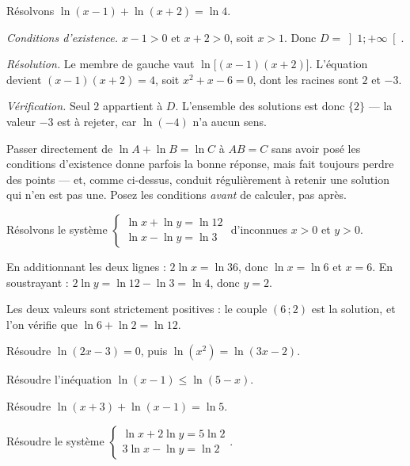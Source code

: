\begin{exemple}
Résolvons $\ln(x-1) + \ln(x+2) = \ln 4$.

\emph{Conditions d'existence.} $x-1>0$ et $x+2>0$, soit $x>1$. Donc
$D = \left]1;+\infty\right[$.

\emph{Résolution.} Le membre de gauche vaut $\ln\bigl[(x-1)(x+2)\bigr]$.
L'équation devient $(x-1)(x+2) = 4$, soit $x^{2}+x-6 = 0$, dont les racines
sont $2$ et $-3$.

\emph{Vérification.} Seul $2$ appartient à $D$. L'ensemble des solutions est
donc $\{2\}$ — la valeur $-3$ est à rejeter, car $\ln(-4)$ n'a aucun sens.
\end{exemple}

\begin{erreurclassique}
Passer directement de $\ln A + \ln B = \ln C$ à $AB = C$ sans avoir posé les
conditions d'existence donne parfois la bonne réponse, mais fait toujours
perdre des points — et, comme ci-dessus, conduit régulièrement à retenir une
solution qui n'en est pas une. Posez les conditions \emph{avant} de calculer,
pas après.
\end{erreurclassique}

\begin{exemple}
Résolvons le système
$\begin{cases} \ln x + \ln y = \ln 12 \\ \ln x - \ln y = \ln 3 \end{cases}$
d'inconnues $x>0$ et $y>0$.

En additionnant les deux lignes : $2\ln x = \ln 36$, donc $\ln x = \ln 6$ et
$x = 6$. En soustrayant : $2\ln y = \ln 12 - \ln 3 = \ln 4$, donc $y = 2$.

Les deux valeurs sont strictement positives : le couple $(6\,;2)$ est la
solution, et l'on vérifie que $\ln 6 + \ln 2 = \ln 12$.
\end{exemple}

\begin{entrainement}
\exo[\niveau{1}] Résoudre $\ln(2x-3) = 0$, puis $\ln(x^{2}) = \ln(3x-2)$.

\exo[\niveau{2}] Résoudre l'inéquation $\ln(x-1) \leq \ln(5-x)$.

\exo[\niveau{2}] Résoudre $\ln(x+3) + \ln(x-1) = \ln 5$.

\exo[\niveau{3}] Résoudre le système
$\begin{cases} \ln x + 2\ln y = 5\ln 2 \\ 3\ln x - \ln y = \ln 2 \end{cases}$.
\end{entrainement}

